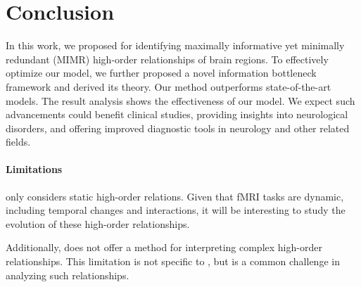\section{Conclusion}
In this work, we proposed \hybrid{} for identifying maximally informative yet minimally redundant (MIMR) high-order relationships of brain regions. To effectively optimize our model, we further proposed a novel information bottleneck framework and derived its theory. Our method outperforms state-of-the-art models. The result analysis shows the effectiveness of our model. We expect such advancements could benefit clinical studies, providing insights into neurological disorders, and offering improved diagnostic tools in neurology and other related fields.
\paragraph{Limitations}
\hybrid{} only considers static high-order relations. Given that fMRI tasks are dynamic, including temporal changes and interactions, it will be interesting to study the evolution of these high-order relationships.

Additionally, \hybrid{} does not offer a method for interpreting complex high-order relationships. This limitation is not specific to \hybrid{}, but is a common challenge in analyzing such relationships.
